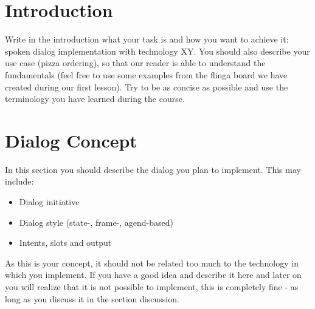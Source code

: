\documentclass[fleqn,10pt]{SelfArx} %
\affiliation{\textsuperscript{1}\textit{Nuremberg Institute of Technology, Faculty of Electrical Engineering, Precision Engineering, Information Technology, Germany}} %
\begin{document}
\maketitle %

\thispagestyle{empty} %


\section*{Introduction} %

Write in the introduction what your task is and how you want to achieve it: spoken dialog implementation with technology XY. You should also describe your use case (pizza ordering), so that our reader is able to understand the fundamentals (feel free to use some examples from the flinga board we have created during our first lesson). Try to be as concise as possible and use the terminology you have learned during the course. 

\section*{Dialog Concept}

In this section you should describe the dialog you plan to implement. This may include: 

\begin{itemize}[noitemsep] %
	\item Dialog initiative
	\item Dialog style (state-, frame-, agend-based)
	\item Intents, slots and output
\end{itemize}

\noindent As this is your concept, it should not be related too much to the technology in which you implement. If you have a good idea and describe it here and later on you will realize that it is not possible to implement, this is completely fine - as long as you discuss it in the section discussion. 
\end{document}
